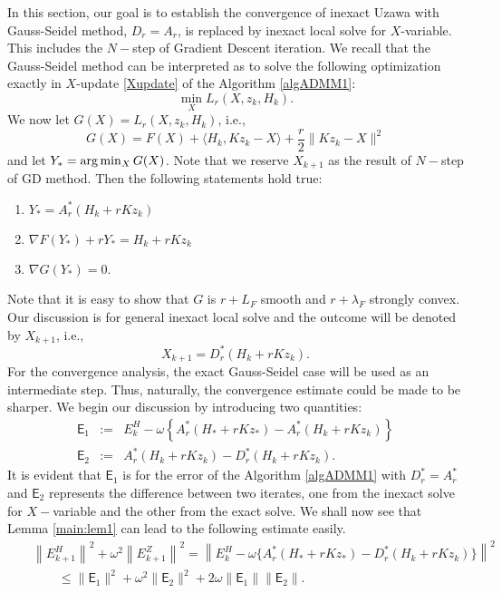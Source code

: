 In this section, our goal is to establish the convergence of inexact Uzawa with Gauss-Seidel method, $D_r = A_r$, is replaced by inexact local solve for $X$-variable. This includes the $N-$step of Gradient Descent iteration. We recall that the Gauss-Seidel method can be interpreted as to solve the following optimization exactly in $X$-update \eqref{Xupdate} of the Algorithm \ref{algADMM1}:  
\begin{equation}
\min_{X} L_r(X,z_k,H_k).  
\end{equation}
We now let $G(X) = L_r(X,z_k,H_k)$, i.e.,  
\begin{equation}
G(X) = F(X) + \langle H_k, Kz_k - X\rangle + \frac{r}{2}\|Kz_k - X\|^2 
\end{equation}
and let $Y_*  = {\rm arg}\min_X G(X)$. Note that we reserve $X_{k+1}$ as the result of $N-$step of GD method. Then the following statements hold true: 
\begin{enumerate} 
\item $Y_* = A_r^*(H_k + rKz_k)$ 
\item $\nabla F(Y_*) + r Y_* = H_k + rKz_k$ 
\item $\nabla G(Y_*) = 0$. 
\end{enumerate} 
Note that it is easy to show that $G$ is $r+L_F$ smooth and $r+\lambda_F$ strongly convex. Our discussion is for general inexact local solve and the outcome will be denoted by $X_{k+1}$, i.e., 
\begin{equation}
X_{k+1} = D_r^*(H_k + rKz_k). 
\end{equation}
For the convergence analysis, the exact Gauss-Seidel case will be used as an intermediate step. Thus, naturally, the convergence estimate could be made to be sharper. We begin our discussion by introducing two quantities:
\begin{eqnarray*}
\textsf{E}_1 &:=& E_k^H - \omega \left \{A_r^{*}(H_* + rKz_*) - A_r^*(H_k + rKz_k) \right \}\\
\textsf{E}_2 &:=& A_r^*(H_k + rKz_k) - D_r^*(H_k + rKz_k).  
\end{eqnarray*}
It is evident that $\textsf{E}_1$ is for the error of the Algorithm \ref{algADMM1} with $D_r^* = A_r^*$ and $\textsf{E}_2$ represents the difference between two iterates, one from the inexact solve for $X-$variable and the other from the exact solve. We shall now see that Lemma \ref{main:lem1} can lead to the following estimate easily. 
\begin{eqnarray*}
&& \left \|E_{k+1}^H \right \|^2 + \omega^2 \left \|E_{k+1}^Z \right \|^2 = \left \|E_k^H - \omega \{ A_r^{*} (H_* + r K z_*) - D_r^{*} (H_k + r K z_k) \} \right \|^2 \\
&& \qquad \leq \|\textsf{E}_1\|^2 + \omega^2 \|\textsf{E}_2\|^2 + 2 \omega \|\textsf{E}_1\| \|\textsf{E}_2\|. 
\end{eqnarray*}
